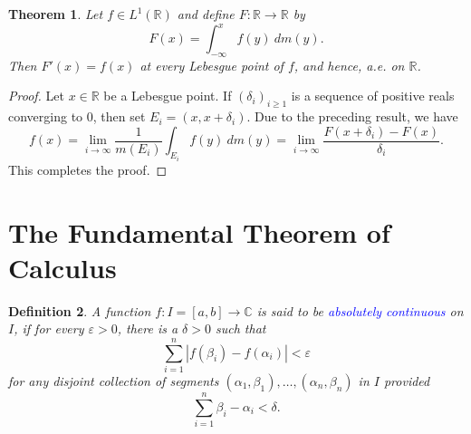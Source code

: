 \documentclass[12pt]{article}
\theoremstyle{thmstyle}
\newtheorem{theorem}{Theorem}[section]
\theoremstyle{defstyle}
\newtheorem{definition}[theorem]{Definition}
\newcommand{\R}{\mathbb{R}}
\newcommand{\bbC}{\mathbb{C}}
\newcommand{\define}[1]{\textcolor{blue}{\textit{#1}}}
\renewcommand{\ge}{\geqslant}
\begin{document}
\begin{theorem}
    Let $f\in L^1(\R)$ and define $F:\R\to\R$ by 
    \begin{equation*}
        F(x) = \int_{-\infty}^x f(y)~dm(y).
    \end{equation*}
    Then $F'(x) = f(x)$ at every Lebesgue point of $f$, and hence, a.e. on $\R$.
\end{theorem}
\begin{proof}
    Let $x\in\R$ be a Lebesgue point. If $(\delta_i)_{i\ge 1}$ is a sequence of positive reals converging to $0$, then set $E_i = (x, x+ \delta_i)$. Due to the preceding result, we have 
    \begin{equation*}
        f(x) = \lim_{i\to\infty}\frac{1}{m(E_i)}\int_{E_i}f(y)~dm(y) = \lim_{i\to\infty}\frac{F(x + \delta_i) - F(x)}{\delta_i}.
    \end{equation*}
    This completes the proof.
\end{proof}

\section{The Fundamental Theorem of Calculus}

\begin{definition}
    A function $f: I= [a,b]\to\bbC$ is said to be \define{absolutely continuous} on $I$, if for every $\varepsilon > 0$, there is a $\delta > 0$ such that 
    \begin{equation*}
        \sum_{i = 1}^n |f(\beta_i) - f(\alpha_i)| < \varepsilon
    \end{equation*}
    for any disjoint collection of segments $(\alpha_1,\beta_1),\dots,(\alpha_n,\beta_n)$ in $I$ provided 
    \begin{equation*}
        \sum_{i = 1}^n\beta_i - \alpha_i < \delta.
    \end{equation*}
\end{definition}
\end{document}
